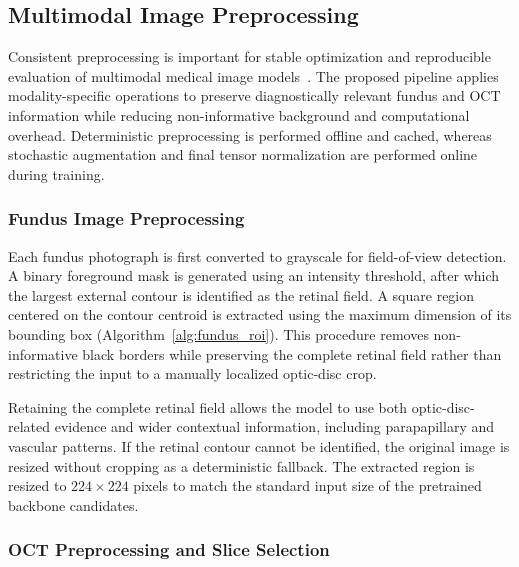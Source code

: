 \documentclass{ieeeaccess}
\begin{document}
\subsection{Multimodal Image Preprocessing}
\label{subsec:preprocessing}

Consistent preprocessing is important for stable optimization and reproducible evaluation of multimodal medical image models~\cite{virbukaite2023impact,sun2025hybrid}. The proposed pipeline applies modality-specific operations to preserve diagnostically relevant fundus and OCT information while reducing non-informative background and computational overhead. Deterministic preprocessing is performed offline and cached, whereas stochastic augmentation and final tensor normalization are performed online during training.


\subsubsection{Fundus Image Preprocessing}
\label{subsubsec:fundus_preprocessing}

Each fundus photograph is first converted to grayscale for field-of-view detection. A binary foreground mask is generated using an intensity threshold, after which the largest external contour is identified as the retinal field. A square region centered on the contour centroid is extracted using the maximum dimension of its bounding box (Algorithm~\ref{alg:fundus_roi}). This procedure removes non-informative black borders while preserving the complete retinal field rather than restricting the input to a manually localized optic-disc crop.

Retaining the complete retinal field allows the model to use both optic-disc-related evidence and wider contextual information, including parapapillary and vascular patterns. If the retinal contour cannot be identified, the original image is resized without cropping as a deterministic fallback. The extracted region is resized to $224\times224$ pixels to match the standard input size of the pretrained backbone candidates.

\subsubsection{OCT Preprocessing and Slice Selection}
\label{subsubsec:oct_preprocessing}
\end{document}
